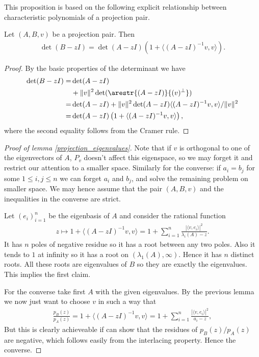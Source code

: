 This proposition is based on the following explicit relationship between characteristic polynomials of a projection pair.

\begin{lem}\label{projection_characteristic_polynomial}
	Let $(A, B, v)$ be a projection pair. Then
	\begin{align*}
		\det(B - z I) = \det(A - z I) \left(1 + \langle (A - z I)^{-1}v, v\rangle\right).
	\end{align*}
\end{lem}
\begin{proof}
	By the basic properties of the determinant we have
	\begin{align*}
		\det(B - z I) =& \det(A - z I) \\
		&+ \|v\|^2 \det(\arestr{(A - z I)}{(v)^{\perp}}) \\
		=& \det(A - z I) + \|v\|^2 \det(A - z I) \langle (A - zI)^{-1} v, v \rangle/\|v\|^2 \\
		=&  \det(A - z I) \left(1 + \langle (A - z I)^{-1}v, v\rangle\right),
	\end{align*}
	where the second equality follows from the Cramer rule.
\end{proof}

\begin{proof}[Proof of lemma \ref{projection_eigenvalues}]
	Note that if $v$ is orthogonal to one of the eigenvectors of $A$, $P_{v}$ doesn't affect this eigenspace, so we may forget it and restrict our attention to a smaller space. Similarly for the converse: if $a_{i} = b_{j}$ for some $1 \leq i, j \leq n$ we can forget $a_{i}$ and $b_{j}$, and solve the remaining problem on smaller space. We may hence assume that the pair $(A, B, v)$ and the inequalities in the converse are strict.

	Let $(e_{i})_{i = 1}^{n}$ be the eigenbasis of $A$ and consider the rational function
	\begin{align*}
		z \mapsto 1 + \langle (A - z I)^{-1}v, v\rangle = 1 + \sum_{i = 1}^{n} \frac{|\langle v, e_{i} \rangle|^2}{\lambda_{i}(A) - z}.
	\end{align*}
	It has $n$ poles of negative residue so it has a root between any two poles. Also it tends to $1$ at infinity so it has a root on $(\lambda_{1}(A), \infty)$. Hence it has $n$ distinct roots. All these roots are eigenvalues of $B$ so they are exactly the eigenvalues. This implies the first claim.

	For the converse take first $A$ with the given eigenvalues. By the previous lemma we now just want to choose $v$ in such a way that
	\begin{align*}
		\frac{p_{B}(z)}{p_{A}(z)} = 1 + \langle (A - z I)^{-1}v, v\rangle= 1 + \sum_{i = 1}^{n} \frac{|\langle v, e_{i} \rangle|^2}{a_{i} - z},
	\end{align*}
	But this is clearly achieveable if can show that the residues of $p_{B}(z)/p_{A}(z)$ are negative, which follows easily from the interlacing property. Hence the converse.
\end{proof}

